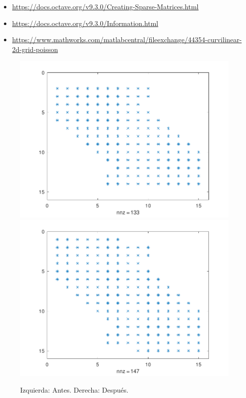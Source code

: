 \begin{problem}
\begin{itemize}
    \item

          \url{https://docs.octave.org/v9.3.0/Creating-Sparse-Matrices.html}

    \item

          \url{https://docs.octave.org/v9.3.0/Information.html}

    \item

          \url{https://www.mathworks.com/matlabcentral/fileexchange/44354-curvilinear-2d-grid-poisson}
\end{itemize}

\begin{figure}[ht!]
    \centering
    \includegraphics[width=.39\paperwidth]{../examples/octave/elliptic1Dsparsebefore.pdf}
    \includegraphics[width=.39\paperwidth]{../examples/octave/elliptic1Dsparseafter.pdf}
    \caption{Izquierda: Antes. Derecha: Después.}
\end{figure}


\end{problem}
